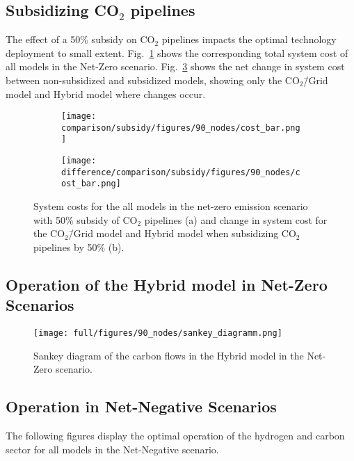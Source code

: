 \documentclass[twocolumn]{article}
\newcommand{\carbon}{CO$_2$}
\newcommand{\carbonmodel}{CO$_2$\=/Grid model}
\newcommand{\hybridmodel}{Hybrid model}
\begin{document}
\clearpage
\subsection{Subsidizing \carbon{} pipelines}
\label{sec:subsidy}

The effect of a 50\% subsidy on \carbon{} pipelines impacts the optimal technology deployment to small extent. Fig.~\ref{fig:cost_bar_subsidy} shows the corresponding total system cost of all models in the Net-Zero scenario. Fig.~\ref{fig:cost_bar_diff_subsidy} shows the net change in system cost between non-subsidized and subsidized models, showing only the \carbonmodel{} and \hybridmodel{} where changes occur.

\begin{figure}[ht!]
    \centering
    \begin{subfigure}{.5\textwidth}
    \texttt{[image: comparison/subsidy/figures/90\_nodes/cost\_bar.png]}
    \caption{}
    \label{fig:cost_bar_subsidy}
\end{subfigure}%
\begin{subfigure}{.5\textwidth}
    \centering
    \texttt{[image: difference/comparison/subsidy/figures/90\_nodes/cost\_bar.png]}
    \caption{}
    \label{fig:cost_bar_diff_subsidy}
\end{subfigure}
\caption{System costs for the all models in the net-zero emission scenario with 50\% subsidy of \carbon{} pipelines (a) and change in system cost for the \carbonmodel{} and \hybridmodel{} when subsidizing \carbon{} pipelines by 50\% (b).}
\end{figure}


\clearpage
\subsection{Operation of the \hybridmodel{} in Net-Zero Scenarios}

\begin{figure}[h!]
    \centering
    \texttt{[image: full/figures/90\_nodes/sankey\_diagramm.png]}
    \caption{Sankey diagram of the carbon flows in the \hybridmodel{} in the Net-Zero scenario.}
    \label{fig:sankey_diagramm}
\end{figure}



\clearpage
\subsection{Operation in Net-Negative Scenarios}
The following figures display the optimal operation of the hydrogen and carbon sector for all models in the Net-Negative scenario.
\end{document}
